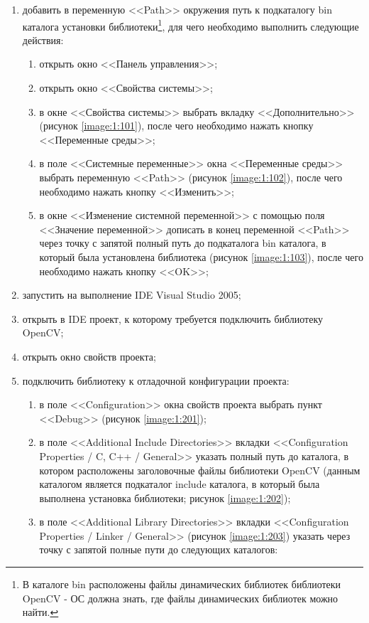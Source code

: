 \begin{enumerate}

	\item добавить в переменную <<Path>> окружения путь к подкаталогу bin каталога установки библиотеки\footnote{В каталоге bin расположены файлы динамических библиотек библиотеки OpenCV - ОС должна знать, где файлы динамических библиотек можно найти.}, для чего необходимо выполнить следующие действия:

	\begin{enumerate}

		\item открыть окно <<Панель управления>>;
		\item открыть окно <<Свойства системы>>;
		\item в окне <<Свойства системы>> выбрать вкладку <<Дополнительно>> (рисунок \ref{image:1:101}), после чего необходимо нажать кнопку <<Переменные среды>>;
		\item в поле <<Системные переменные>> окна <<Переменные среды>> выбрать переменную <<Path>> (рисунок \ref{image:1:102}), после чего необходимо нажать кнопку <<Изменить>>;
		\item в окне <<Изменение системной переменной>> с помощью поля <<Значение переменной>> дописать в конец переменной <<Path>> через точку с запятой полный путь до подкаталога bin каталога, в который была установлена библиотека (рисунок \ref{image:1:103}), после чего необходимо нажать кнопку <<OK>>;

	\end{enumerate}

	\item запустить на выполнение IDE Visual Studio 2005;
	\item открыть в IDE проект, к которому требуется подключить библиотеку OpenCV;
	\item открыть окно свойств проекта;
	\item подключить библиотеку к отладочной конфигурации проекта:

	\begin{enumerate}

		\item в поле <<Configuration>> окна свойств проекта выбрать пункт <<Debug>> (рисунок \ref{image:1:201});
		\item в поле <<Additional Include Directories>> вкладки <<Configuration Properties / C, C++ / General>> указать полный путь до каталога, в котором расположены заголовочные файлы библиотеки OpenCV (данным каталогом является подкаталог include каталога, в который была выполнена установка библиотеки; рисунок \ref{image:1:202});
		\item в поле <<Additional Library Directories>> вкладки <<Configuration Properties / Linker / General>> (рисунок \ref{image:1:203}) указать через точку с запятой полные пути до следующих каталогов:


\end{enumerate}
\end{enumerate}
